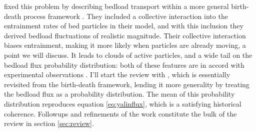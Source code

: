 \citet{Ancey2008} fixed this problem by describing bedload transport within a more general birth-death process framework \citep{Cox1965}. 
They included a collective interaction into the entrainment rates of bed particles in their model, and with this inclusion they derived bedload fluctuations of realistic magnitude. 
Their collective interaction biases entrainment, making it more likely when particles are already moving, a point we will discuss.  
It leads to clouds of active particles, and a wide tail on the bedload flux probability distribution: both of these features are in accord with experimental observations \citep{Drake1988, Ancey2006, Ancey2008}. 
I'll start the review with \citet{Ancey2006}, which is essentially \citet{Einstein1950} revisited from the birth-death framework, lending it more generality by treating the bedload flux as a probability distribution.   
The mean of this probability distribution reproduces equation \ref{eq:yalinflux}, which is a satisfying historical coherence. 
Followups and refinements of the \citet{Ancey2006} work constitute the bulk of the review in section \ref{sec:review}. 

